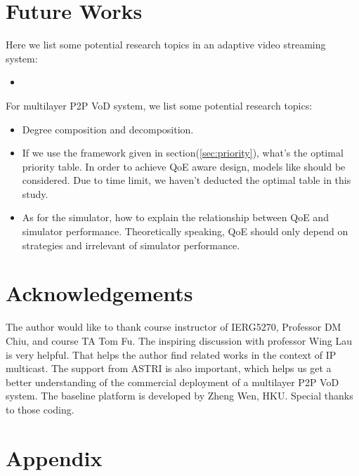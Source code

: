 \documentclass[11pt,a4paper]{article}
\begin{document}
\section{Future Works}
\label{sec:future}

Here we list some potential research topics in an adaptive video streaming 
system:
\begin{itemize}
	\item 
\end{itemize} 

For multilayer P2P VoD system, we list some potential research topics:
\begin{itemize}
	\item Degree composition and decomposition. 
	\item If we use the framework given in section(\ref{sec:priority}), 
	what's the optimal priority table. In order to achieve QoE aware design, 
	models like \cite{wang2011-perceptual} should be considered. Due to 
	time limit, we haven't deducted the optimal table in this study. 
	\item As for the simulator, how to explain the relationship between 
	QoE and simulator performance. Theoretically speaking, QoE should only 
	depend on strategies and irrelevant of simulator performance. 
\end{itemize}



\section*{Acknowledgements}

The author would like to thank course instructor of IERG5270, Professor
DM Chiu, and course TA Tom Fu. The inspiring discussion with professor 
Wing Lau is very helpful. That helps the author find related works 
in the context of IP multicast. The support from ASTRI\cite{astri} is also important, 
which helps us get a better understanding of the commercial deployment
of a multilayer P2P VoD system. The baseline platform is developed 
by Zheng Wen, HKU. Special thanks to those coding. 


\pagebreak
\section*{Appendix}


\pagebreak
{}

\end{document}
